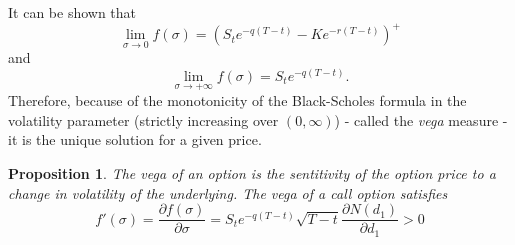 \documentclass{article}
\newtheorem{prop}[thm]{Proposition}
\theoremstyle{definition}
\theoremstyle{remark}
\begin{document}
It can be shown that 
\begin{equation*}
\lim_{\sigma \rightarrow 0}{f(\sigma)}=(S_te^{-q(T-t)}-Ke^{-r(T-t)})^+
\end{equation*}
and
\begin{equation*}
\lim_{\sigma \rightarrow +\infty}{f(\sigma)}=S_te^{-q(T-t)}.
\end{equation*}
Therefore, because of the monotonicity of the Black-Scholes formula in the volatility parameter (strictly increasing over $(0,\infty)$) - called the \textit{vega} measure -
it is the unique solution for a given price.

\begin{prop}
The \emph{vega} of an option is the sentitivity of the option price to a change in volatility of the underlying. The vega of a call option satisfies
\begin{equation}
f'(\sigma)=\frac{\partial f(\sigma)}{\partial \sigma}=S_te^{-q(T-t)}\sqrt{T-t}\frac{\partial N(d_1)}{\partial d_1}>0
\end{equation}
\end{prop}
\end{document}
